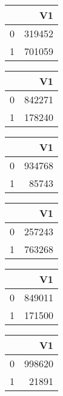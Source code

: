 \bigskip\bigskip
\centering
\begin{tabular}{rr}
  \hline
 & V1 \\ 
  \hline
0 & 319452 \\ 
  1 & 701059 \\ 
   \hline
\end{tabular}

\bigskip\bigskip
\centering
\begin{tabular}{rr}
  \hline
 & V1 \\ 
  \hline
0 & 842271 \\ 
  1 & 178240 \\ 
   \hline
\end{tabular}

\bigskip\bigskip
\centering
\begin{tabular}{rr}
  \hline
 & V1 \\ 
  \hline
0 & 934768 \\ 
  1 & 85743 \\ 
   \hline
\end{tabular}

\bigskip\bigskip
\centering
\begin{tabular}{rr}
  \hline
 & V1 \\ 
  \hline
0 & 257243 \\ 
  1 & 763268 \\ 
   \hline
\end{tabular}

\bigskip\bigskip
\centering
\begin{tabular}{rr}
  \hline
 & V1 \\ 
  \hline
0 & 849011 \\ 
  1 & 171500 \\ 
   \hline
\end{tabular}

\bigskip\bigskip
\centering
\begin{tabular}{rr}
  \hline
 & V1 \\ 
  \hline
0 & 998620 \\ 
  1 & 21891 \\ 
   \hline
\end{tabular}

